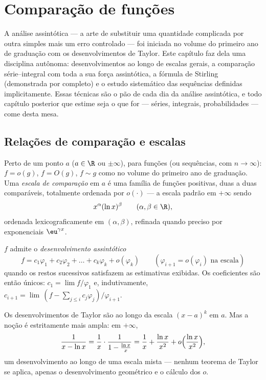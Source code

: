\chapter{Comparação de funções}\label{ch:b2:comparison}

A análise assintótica --- a arte de substituir uma quantidade complicada
por outra simples mais um erro controlado --- foi iniciada no volume do
primeiro ano de graduação com os desenvolvimentos de Taylor. Este capítulo faz dela uma disciplina
autônoma: desenvolvimentos ao longo de escalas gerais, a comparação
série--integral com toda a sua força assintótica, a fórmula de Stirling (demonstrada
por completo) e o estudo sistemático das sequências definidas
implicitamente. Essas técnicas são o pão de cada dia da análise
assintótica, e todo capítulo posterior que estime seja o que for ---
séries, integrais, probabilidades --- come desta mesa.

\section{Relações de comparação e escalas}

\begin{definition}\label{def:b2:comparison:landau}
Perto de um ponto $a$ ($a \in \R$ ou $\pm\infty$), para funções (ou
sequências, com $n \to \infty$): $f = o(g)$, $f = O(g)$, $f \sim g$
como no volume do primeiro ano de graduação. Uma \emph{escala de
comparação} em $a$ é uma família de funções
positivas, duas a duas comparáveis, totalmente ordenada por $o(\cdot)$ ---
a escala padrão em $+\infty$ sendo
\[
x^{\alpha} (\ln x)^{\beta}
\qquad (\alpha, \beta \in \R),
\]
ordenada lexicograficamente em $(\alpha, \beta)$, refinada quando preciso
por exponenciais $\eu^{\gamma x}$.
\end{definition}

\begin{definition}\label{def:b2:comparison:expansion}
$f$ admite o \emph{desenvolvimento assintótico}
\[
f = c_1 \varphi_1 + c_2\varphi_2 + \dots + c_k \varphi_k +
o(\varphi_k)
\qquad (\varphi_{i+1} = o(\varphi_i) \text{ na escala})
\]
quando os restos sucessivos satisfazem as estimativas exibidas. Os
coeficientes são então únicos: $c_1 = \lim f/\varphi_1$ e,
indutivamente, $c_{i+1} = \lim\,(f - \sum_{j \leq i}
c_j\varphi_j)/\varphi_{i+1}$.
\end{definition}

\begin{example}
Os desenvolvimentos de Taylor são  ao longo da escala $(x -
a)^k$ em $a$. Mas a noção é estritamente mais ampla: em $+\infty$,
\[
\frac{1}{x - \ln x}
= \frac1x \cdot \frac{1}{1 - \frac{\ln x}{x}}
= \frac1x + \frac{\ln x}{x^2} + o\Bigl(\frac{\ln x}{x^2}\Bigr),
\]
um desenvolvimento ao longo de uma escala mista --- nenhum teorema de Taylor se aplica,
apenas o desenvolvimento geométrico e o cálculo dos $o$.
\end{example}

